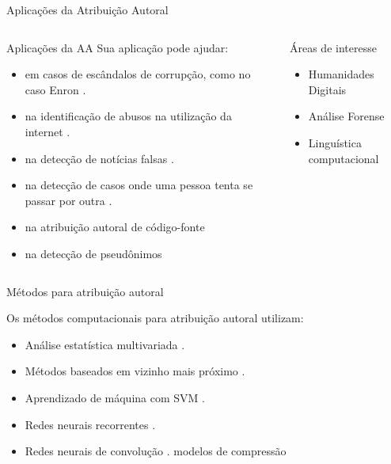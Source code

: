 \begin{frame}{Aplicações da Atribuição Autoral}

\begin{columns}
	\begin{column}{0.65\textwidth}
		\begin{block}{Aplicações da AA}
			Sua aplicação pode ajudar: 
			\begin{itemize}\itemsep9pt
				\item  em casos de escândalos de corrupção, como no caso Enron
				 \cite{corpusEnron,Chen2011}.
				\item na identificação de abusos na utilização da internet \cite{Gillam2012quite}.
				\item na detecção de notícias falsas \cite{Peng2016}.
				\item na detecção de casos onde uma pessoa tenta se passar por outra \cite{Koppel2018_pseud}.
				\item na atribuição autoral de código-fonte \cite{Alsulami2017}
				\item na detecção de pseudônimos \cite{Juola15}
				
			\end{itemize}
		\end{block}
	\end{column}
	\begin{column}{0.3\textwidth}
		\begin{block}{Áreas de interesse}
			\begin{itemize}
				\item Humanidades Digitais
				\item Análise Forense
				\item Linguística computacional
			\end{itemize}
		\end{block}
	\end{column}
\end{columns}

\end{frame}


\begin{frame}{Métodos para atribuição autoral}

Os métodos computacionais para atribuição autoral utilizam: 
\begin{itemize}
  \item Análise estatística multivariada \cite{Savoy2016,AA_delta2017}.
  \item Métodos baseados em vizinho mais próximo \cite{Kocher2017Verificacao,Koppel2018_pseud,Varela2016}.
  \item Aprendizado de máquina com SVM \cite{Schwartz2013,aa-distortion}.
  \item Redes neurais recorrentes \cite{Bagnall2016}.
  \item Redes neurais de convolução \cite{Shrestha2017,Sari2016}.
  modelos de compressão \cite{Halvani2018}
\end{itemize}

\end{frame}
